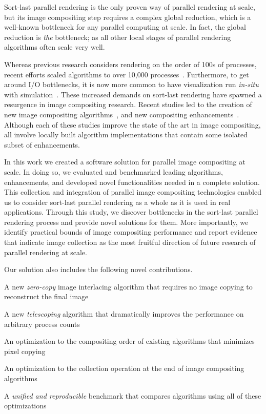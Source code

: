 \documentclass{sig-alternate}
\newcommand*{\lcite}[1]{~\cite{#1}}
\newenvironment{packed_itemize}{
\begin{itemize}
  \setlength{\topsep}{0pt}
  \setlength{\itemsep}{0pt}
  \setlength{\parskip}{0pt}
  \setlength{\parsep}{0pt}
  \setlength{\partopsep}{0pt}
}{\end{itemize}}
\begin{document}
Sort-last parallel rendering is the only proven way of parallel rendering
at scale, but its image compositing step requires a complex global reduction, 
which is a well-known bottleneck for any parallel computing at scale.
In fact, the global reduction is \textit{the} bottleneck; as all other local 
stages of parallel rendering algorithms often scale very well.

Whereas previous research considers rendering on the
order of 100s of processes, recent efforts scaled algorithms to over 10,000
processes\lcite{Peterka2009, Childs2010}.  
Furthermore, to get around I/O bottlenecks, it is now more common to have
visualization run \emph{in-situ} with
simulation\lcite{Ma2009:SciDACReview,Ma2009:CG&A,Yu2010,Tu2006}.
These increased demands on sort-last rendering have spawned a resurgence 
in image compositing research.  
Recent studies led to the creation of new image compositing 
algorithms\lcite{23Swap,RadixK}, and new compositing
enhancements\lcite{Kendall2010}.  Although each of these studies improve
the state of the art in image compositing, all involve locally built
algorithm implementations that contain some isolated subset of
enhancements.  

In this work we created a software solution for parallel image compositing 
at scale. In doing so, we evaluated and benchmarked leading algorithms,
enhancements, and developed novel functionalities needed in
a complete solution.
This collection and
integration of parallel image compositing technologies enabled us to
consider sort-last parallel rendering as a whole as it is used in real
applications. Through this study, we discover bottlenecks in the
sort-last parallel rendering process and provide novel solutions for them.
More importantly, we identify practical bounds of image compositing
performance and report evidence that indicate image collection as 
the most fruitful direction of future research of parallel rendering
at scale.

Our solution also includes the following novel contributions.
\begin{packed_itemize}
\item A new \textit{zero-copy} image interlacing algorithm that requires 
no image copying to reconstruct the final image
\item A new \textit{telescoping} algorithm that dramatically improves 
the performance on arbitrary process counts
\item An optimization to the compositing order of existing algorithms 
that minimizes pixel copying
\item An optimization to the collection operation at the end of image 
compositing algorithms
\item A \textit{unified and reproducible} benchmark that compares 
algorithms using all of these optimizations
\end{packed_itemize}
\end{document}
